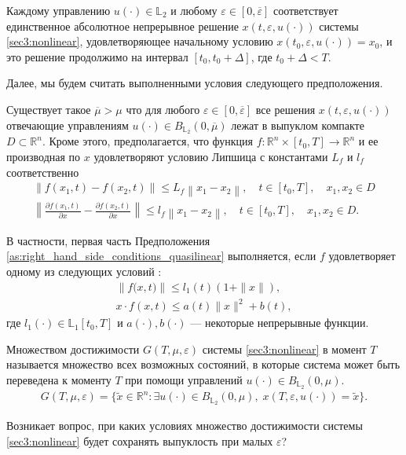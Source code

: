 \documentclass[../main.tex]{subfiles}
\begin{document}
Каждому управлению $u(\cdot) \in \mathbb{L}_2$ и любому $\varepsilon \in [0,\overline{\varepsilon}]$ соответствует единственное абсолютное непрерывное решение $ x(t,\varepsilon, u(\cdot)) $ системы \eqref{sec3:nonlinear}, удовлетворяющее начальному условию $ x(t_0,\varepsilon, u(\cdot)) = x_0$, и это решение продолжимо на интервал $[t_0, t_0 + \Delta]$, где $t_0 + \Delta < T$. 

Далее, мы будем считать выполненными условия следующего предположения.

\begin{assumption}\label{as:right_hand_side_conditions_quasilinear}
    
    Существует такое $\overline{\mu} > \mu $ что для любого $\varepsilon \in [0, \overline{\varepsilon}] $ все решения $ x(t,\varepsilon, u(\cdot)) $ отвечающие управлениям $u(\cdot) \in B_{\mathbb{L}_2}(0,\overline{\mu})$  лежат в выпуклом компакте $D \subset \mathbb{R}^n$.
    Кроме этого, предполагается, что функция $f: \mathbb{R}^n \times [t_0,T] \to \mathbb{R}^n$ и ее производная по $x$ удовлетворяют условию Липшица с константами $L_f$ и $l_f$ соответственно
    \begin{gather*}
        \left\| f(x_1,t) - f(x_2,t) \right\| \leqslant L_f \left\| x_1 - x_2 \right\|, \quad t\in[t_0,T], \quad x_1, x_2 \in D\\
        \left\| \frac{\partial f(x_1,t)}{\partial x} - \frac{\partial f(x_2,t)}{\partial x} \right\| \leqslant l_f \left\| x_1 - x_2 \right\|, \quad t\in[t_0,T], \quad x_1, x_2 \in D.
    \end{gather*}
\end{assumption} 

В частности, первая часть Предположения \ref{as:right_hand_side_conditions_quasilinear} выполняется, если  $f$ удовлетворяет одному из следующих условий \cite{Fillipov2}:
\begin{gather}\label{sec3:sublinear_growth}
    \left\|f\big(x,t\big) \right\| \leqslant l_1(t) (1 + \|x\|), \\ 
    x \cdot f(x,t) \leqslant a(t) \|x\|^2 + b(t),
\end{gather}
где $l_1(\cdot) \in \mathbb{L}_1[t_0,T]$ и $a(\cdot), b(\cdot)$ --- некоторые непрерывные функции.

\begin{definition} 
    Множеством достижимости $G(T,\mu,\varepsilon) $ системы \eqref{sec3:nonlinear} в момент $T$ называется множество всех возможных состояний, в которые система может быть переведена  к моменту $T$ при помощи управлений  $ u(\cdot) \in B_{\mathbb{L}_2}(0,\mu) $.
    \begin{gather*}
        G(T,\mu,\varepsilon) =\{\widetilde{x}\in \mathbb{R}^n:\exists u(\cdot)\in B_{\mathbb{L}_2}(0,\mu),\; x(T,\varepsilon,u(\cdot)) = \widetilde{x}\}.
    \end{gather*}
\end{definition} 
Возникает вопрос, при каких условиях множество достижимости системы \eqref{sec3:nonlinear} будет сохранять выпуклость при малых $\varepsilon$?
\end{document}
